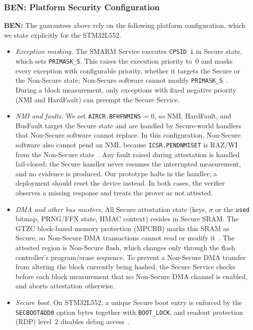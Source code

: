 \documentclass{ieeeaccess}
\DeclareRobustCommand{\ben}[1]{{\color{BENcolor}\textbf{BEN:} #1}}
\begin{document}
\subsubsection{\ben{Platform Security Configuration}}
\label{sec:platform-config}
\ben{The guarantees above rely on the following platform configuration, which we state explicitly for the STM32L552.
\begin{itemize}
  \item \emph{Exception masking.} The SMARM Service executes \texttt{CPSID~i} in Secure state, which sets \texttt{PRIMASK\_S}.
  This raises the execution priority to~$0$ and masks every exception with configurable priority, whether it targets the Secure or the Non-Secure state; Non-Secure software cannot modify \texttt{PRIMASK\_S}~\cite{armv8m-arm,pm0264}.
  During a block measurement, only exceptions with fixed negative priority (NMI and HardFault) can preempt the Secure Service.
  \item \emph{NMI and faults.} We set \texttt{AIRCR.BFHFNMINS}$\,=0$, so NMI, HardFault, and BusFault target the Secure state and are handled by Secure-world handlers that Non-Secure software cannot replace.
  In this configuration, Non-Secure software also cannot pend an NMI, because \texttt{ICSR.PENDNMISET} is RAZ/WI from the Non-Secure state~\cite{pm0264}.
  Any fault raised during attestation is handled fail-closed: the Secure handler never resumes the interrupted measurement, and no evidence is produced.
  Our prototype halts in the handler; a deployment should reset the device instead.
  In both cases, the verifier observes a missing response and treats the prover as not attested.
  \item \emph{DMA and other bus masters.} All Secure attestation state (keys, $\sigma$ or the \texttt{used} bitmap, PRNG/FFX state, HMAC context) resides in Secure SRAM.
  The GTZC block-based memory protection (MPCBB) marks this SRAM as Secure, so Non-Secure DMA transactions cannot read or modify it~\cite{an5347,kiri2026vecodi}.
  The attested region is Non-Secure flash, which changes only through the flash controller's program/erase sequence.
  To prevent a Non-Secure DMA transfer from altering the block currently being hashed, the Secure Service checks before each block measurement that no Non-Secure DMA channel is enabled, and aborts attestation otherwise.
  \item \emph{Secure boot.} On STM32L552, a unique Secure boot entry is enforced by the \texttt{SECBOOTADD0} option bytes together with \texttt{BOOT\_LOCK}, and readout protection (RDP) level~$2$ disables debug access~\cite{an5347}.

\end{itemize}}
\end{document}
